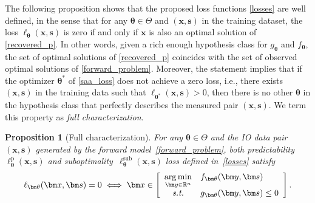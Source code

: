 \documentclass{article}
\DeclareMathOperator*{\argmin}{arg\,min}
\theoremstyle{plain}
\newtheorem{proposition}[theorem]{Proposition}
\begin{document}
The following proposition shows that the proposed loss functions \eqref{losses} are well defined, in the sense that for any $\bm\theta\in\Theta$ and  $(\bm x,\bm s)$ in the training dataset, the loss $\ell_{\bm \theta}(\bm x,\bm s)$ is zero if and only if $\bm x$ is also an optimal solution of \eqref{recovered_p}. In other words, given a rich enough hypothesis class for $g_{\bm\theta}$ and $f_{\bm\theta}$, the set of optimal solutions of \eqref{recovered_p} coincides with the set of observed optimal solutions of \eqref{forward_problem}. Moreover, the statement implies that if the optimizer $\bm \theta^*$ of \eqref{saa_loss} does not achieve a zero loss, i.e., there exists  $(\bm x, \bm s)$ in the training data such that  $\ell_{\bm \theta^*}(\bm x,\bm s) > 0$, then there is no other $\bm\theta$ in the hypothesis class that perfectly describes the measured pair $(\bm x,\bm s)$. We term this property as \emph{full characterization}. 

\begin{proposition}[Full characterization]\label{prop:full}
For any $\bm \theta\in\Theta$ and the IO data pair~$(\bm x,\bm s)$ generated by the forward model~\eqref{forward_problem}, both predictability~$\ell_{\bm\theta}^\text{p}(\bm x,\bm s)$ and suboptimality~$\ell_{\bm\theta}^\text{sub}(\bm x,\bm s)$ loss defined in~\eqref{losses} satisfy
\begin{equation*}\label{proposition_full_characterization}
     \ell_{\bm \theta}(\bm x,\bm s) =0 \iff \bm x \in \left[
     \begin{array}{cl}
          \displaystyle\argmin_{\bm y\in\mathbb{R}^n}&  f_{\bm \theta}(\bm y,\bm s)  \\
          \text{\em s.t.}&  g_{\bm \theta}(\bm y,\bm s) \leq 0
     \end{array}
     \right].
\end{equation*}
\end{proposition}
\end{document}
